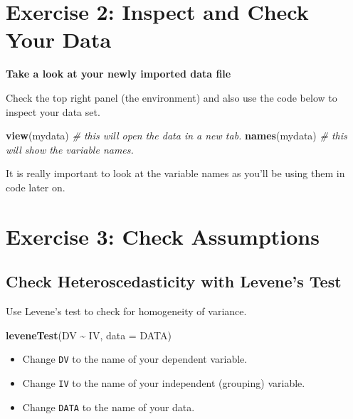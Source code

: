 \documentclass[
]{book}
\newenvironment{Shaded}{\begin{snugshade}}{\end{snugshade}}
\newcommand{\AttributeTok}[1]{\textcolor[rgb]{0.13,0.29,0.53}{#1}}
\newcommand{\CommentTok}[1]{\textcolor[rgb]{0.56,0.35,0.01}{\textit{#1}}}
\newcommand{\FunctionTok}[1]{\textcolor[rgb]{0.13,0.29,0.53}{\textbf{#1}}}
\newcommand{\NormalTok}[1]{#1}
\newcommand{\SpecialCharTok}[1]{\textcolor[rgb]{0.81,0.36,0.00}{\textbf{#1}}}
\providecommand{\tightlist}{%
  \setlength{\itemsep}{0pt}\setlength{\parskip}{0pt}}
\let\oldsection\section
\renewcommand{\section}{\needspace{5\baselineskip}\oldsection}
\let\oldsubsection\subsection
\renewcommand{\subsection}{\needspace{3\baselineskip}\oldsubsection}  %
\begin{document}
\section{Exercise 2: Inspect and Check Your Data}\label{exercise-2-inspect-and-check-your-data-2}

\textbf{Take a look at your newly imported data file}

Check the top right panel (the environment) and also use the code below to inspect your data set.

\begin{Shaded}
\begin{Highlighting}[]
\FunctionTok{view}\NormalTok{(mydata) }\CommentTok{\# this will open the data in a new tab.}
\FunctionTok{names}\NormalTok{(mydata) }\CommentTok{\# this will show the variable names.}
\end{Highlighting}
\end{Shaded}

It is really important to look at the variable names as you'll be using them in code later on.

\section{Exercise 3: Check Assumptions}\label{exercise-3-check-assumptions}

\subsection{Check Heteroscedasticity with Levene's Test}\label{check-heteroscedasticity-with-levenes-test}

Use Levene's test to check for homogeneity of variance.

\begin{Shaded}
\begin{Highlighting}[]
\FunctionTok{leveneTest}\NormalTok{(DV }\SpecialCharTok{\textasciitilde{}}\NormalTok{ IV, }\AttributeTok{data =}\NormalTok{ DATA)}
\end{Highlighting}
\end{Shaded}

\begin{itemize}
\tightlist
\item
  Change \texttt{DV} to the name of your dependent variable.
\item
  Change \texttt{IV} to the name of your independent (grouping) variable.
\item
  Change \texttt{DATA} to the name of your data.
\end{itemize}
\end{document}
